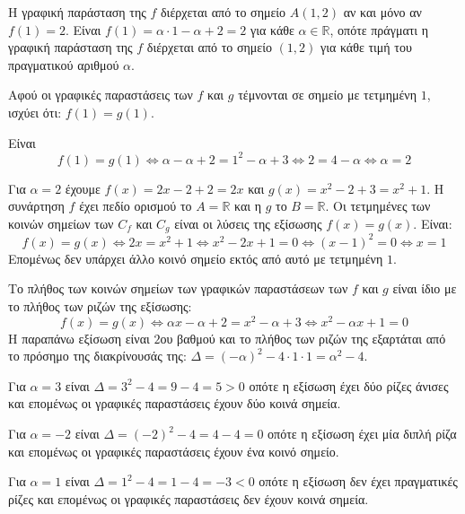 
\begin{alist}
\item Η γραφική παράσταση της $f$ διέρχεται από το σημείο $A(1, 2)$ αν και μόνο αν $f(1) = 2$.
Είναι $f(1) = \alpha \cdot 1 - \alpha + 2 = 2$ για κάθε $\alpha \in \mathbb{R}$, οπότε πράγματι η γραφική παράσταση της $f$ διέρχεται από το σημείο $(1, 2)$ για κάθε τιμή του πραγματικού αριθμού $\alpha$.

\item Αφού οι γραφικές παραστάσεις των $f$ και $g$ τέμνονται σε σημείο με τετμημένη $1$, ισχύει ότι: $f(1) = g(1)$.

\begin{rlist}
\item Είναι
\[f(1) = g(1) \Leftrightarrow \alpha - \alpha + 2 = 1^2 - \alpha + 3 \Leftrightarrow 2 = 4 - \alpha \Leftrightarrow \alpha = 2\]
\item Για $\alpha = 2$ έχουμε $f(x) = 2x - 2 + 2 = 2x$ και $g(x) = x^2 - 2 + 3 = x^2 + 1$.
Η συνάρτηση $f$ έχει πεδίο ορισμού το $A = \mathbb{R}$ και η $g$ το $B = \mathbb{R}$.
Οι τετμημένες των κοινών σημείων των $C_f$ και $C_g$ είναι οι λύσεις της εξίσωσης $f(x) = g(x)$. Είναι:
\[f(x) = g(x) \Leftrightarrow 2x = x^2 + 1 \Leftrightarrow x^2 - 2x + 1 = 0 \Leftrightarrow (x - 1)^2 = 0 \Leftrightarrow x = 1\]
Επομένως δεν υπάρχει άλλο κοινό σημείο εκτός από αυτό με τετμημένη $1$.
\end{rlist}

\item Το πλήθος των κοινών σημείων των γραφικών παραστάσεων των $f$ και $g$ είναι ίδιο με το πλήθος των ριζών της εξίσωσης:
\[f(x) = g(x) \Leftrightarrow \alpha x - \alpha + 2 = x^2 - \alpha + 3 \Leftrightarrow x^2 - \alpha x + 1 = 0\]
Η παραπάνω εξίσωση είναι $2$ου βαθμού και το πλήθος των ριζών της εξαρτάται από το πρόσημο της διακρίνουσάς της: $\Delta = (-\alpha)^2 - 4 \cdot 1 \cdot 1 = \alpha^2 - 4$.

Για $\alpha = 3$ είναι $\Delta = 3^2 - 4 = 9 - 4 = 5 > 0$ οπότε η εξίσωση έχει δύο ρίζες άνισες και επομένως οι γραφικές παραστάσεις έχουν δύο κοινά σημεία.

Για $\alpha = -2$ είναι $\Delta = (-2)^2 - 4 = 4 - 4 = 0$ οπότε η εξίσωση έχει μία διπλή ρίζα και επομένως οι γραφικές παραστάσεις έχουν ένα κοινό σημείο.

Για $\alpha = 1$ είναι $\Delta = 1^2 - 4 = 1 - 4 = -3 < 0$ οπότε η εξίσωση δεν έχει πραγματικές ρίζες και επομένως οι γραφικές παραστάσεις δεν έχουν κοινά σημεία.
\end{alist}

